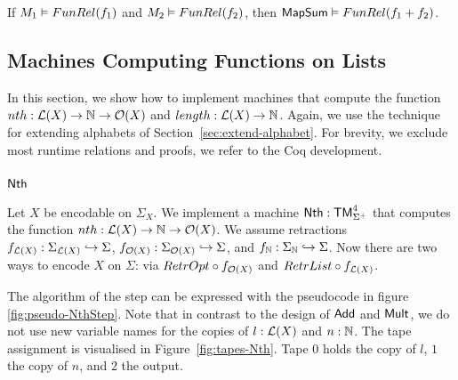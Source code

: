 \begin{lemma}
  \label{lem:MapSum_Computes}
  If $M_1 \mathrel{\vDash} FunRel(f_1)$ and $M_2 \mathrel{\vDash} FunRel(f_2)$, then $\mathsf{MapSum} \mathrel{\vDash} FunRel(f_1+f_2)$.
\end{lemma}


\subsection{Machines Computing Functions on Lists}
\label{sec:ListTM}

In this section, we show how to implement machines that compute the function $nth : \mathcal{L}(X) \rightarrow \mathbb{N} \rightarrow \mathcal{O}(X)$ and
$length : \mathcal{L}(X) \rightarrow \mathbb{N}$.  Again, we use the technique for extending alphabets of Section~\ref{sec:extend-alphabet}.  For brevity, we exclude most
runtime relations and proofs, we refer to the Coq development.

\subsubsection{$\mathsf{Nth}$}
\label{sec:Nth}

Let $X$ be encodable on $\Sigma_X$.  We implement a machine $\mathsf{Nth} : \mathsf{TM}_{\Sigma^+}^4$ that computes the function
$nth : \mathcal{L}(X) \rightarrow \mathbb{N} \rightarrow \mathcal{O}(X)$.  We assume retractions $f_{\mathcal{L}(X)} : \Sigma_{\mathcal{L}(X)} \hookrightarrow \Sigma$,
$f_{\mathcal{O}(X)} : \Sigma_{\mathcal{O}(X)} \hookrightarrow \Sigma$, and $f_{\mathbb{N}} : \Sigma_{\mathbb{N}} \hookrightarrow \Sigma$.  Now there are two ways to encode
$X$ on $\Sigma$: via $RetrOpt \circ f_{\mathcal{O}(X)}$ and $RetrList \circ f_{\mathcal{L}(X)}$.

The algorithm of the step can be expressed with the pseudocode in figure \ref{fig:pseudo-NthStep}.  Note that in contrast to the design of $\mathsf{Add}$
and $\mathsf{Mult}$, we do not use new variable names for the copies of $l:\mathcal{L}(X)$ and $n:\mathbb{N}$.  The tape assignment is visualised in
Figure~\ref{fig:tapes-Nth}.  Tape $0$ holds the copy of $l$, $1$ the copy of $n$, and $2$ the output.


